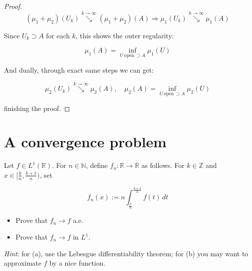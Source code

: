 \documentclass{qlnotes-export}
\begin{document}
\begin{proof}
\[(\mu_{1} + \mu_{2})(U_{k})\operatorname{\searrow ︎}\limits^{k\rightarrow\infty}(\mu_{1} + \mu_{2})(A)\Longrightarrow\mu_{1}(U_{k})\operatorname{\searrow ︎}\limits^{k\rightarrow\infty}\mu_{1}(A)\]

Since \(U_{k} \supset A\) for each \(k\), this shows the outer regularity:

\[\mu_{1}(A) = \inf\limits_{U\ \text{open}\  \supset A}\mu_{1}(U)\]

And dually, through exact same steps we can get:

\[\mu_{2}(U_{k})\operatorname{\searrow ︎}\limits^{k\rightarrow\infty}\mu_{2}(A),\quad\mu_{2}(A) = \inf\limits_{U\ \text{open}\  \supset A}\mu_{2}(U)\]

finishing the proof.

\end{proof}

\section{A convergence problem}\label{a-convergence-problem}

Let \(f \in L^{1}({\mathbb{R}})\). For \(n \in {\mathbb{N}}\), define \(f_{n}:{\mathbb{R}}\rightarrow{\mathbb{R}}\) as follows. For \(k \in {\mathbb{Z}}\) and \(x \in \lbrack\frac{k}{n},\frac{k + 1}{n})\), set

\[f_{n}(x) := n\int_{\frac{k}{n}}^{\frac{k + 1}{n}}f(t)\, dt\]

\begin{itemize}
\item
  Prove that \(f_{n}\rightarrow f\) a.e.
\item
  Prove that \(f_{n}\rightarrow f\) in \(L^{1}\).
\end{itemize}

\emph{Hint}: for (a), use the Lebesgue differentiability theorem; for (b) you may want to approximate \(f\) by a nice function.
\end{document}
